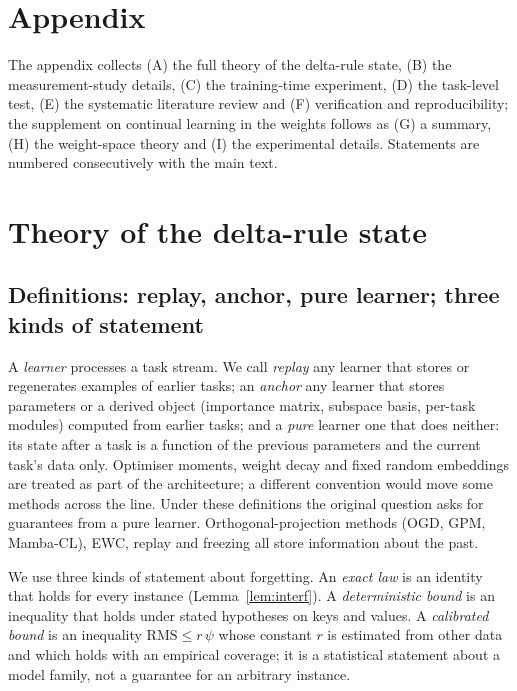 \clearpage
\section*{Appendix}
The appendix collects (A) the full theory of the delta-rule state, (B) the measurement-study details, (C) the training-time experiment, (D) the task-level test, (E) the systematic literature review and (F) verification and reproducibility; the supplement on continual learning in the weights follows as (G) a summary, (H) the weight-space theory and (I) the experimental details. Statements are numbered consecutively with the main text.

\section{Theory of the delta-rule state}\label{app:theory}
\subsection{Definitions: replay, anchor, pure learner; three kinds of statement}
A \emph{learner} processes a task stream. We call \emph{replay} any learner that stores or regenerates examples of earlier tasks; an \emph{anchor} any learner that stores parameters or a derived object (importance matrix, subspace basis, per-task modules) computed from earlier tasks; and a \emph{pure} learner one that does neither: its state after a task is a function of the previous parameters and the current task's data only. Optimiser moments, weight decay and fixed random embeddings are treated as part of the architecture; a different convention would move some methods across the line. Under these definitions the original question asks for guarantees from a pure learner. Orthogonal-projection methods (OGD, GPM, Mamba-CL), EWC, replay and freezing all store information about the past.

We use three kinds of statement about forgetting. An \emph{exact law} is an identity that holds for every instance (Lemma~\ref{lem:interf}). A \emph{deterministic bound} is an inequality that holds under stated hypotheses on keys and values. A \emph{calibrated bound} is an inequality $\mathrm{RMS}\le r\,\psi$ whose constant $r$ is estimated from other data and which holds with an empirical coverage; it is a statistical statement about a model family, not a guarantee for an arbitrary instance.

